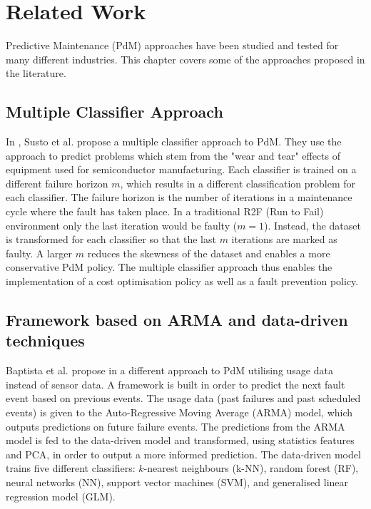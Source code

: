 \chapter{Related Work}
\label{cha:related-work}

Predictive Maintenance (PdM) approaches have been studied and tested for many different industries.
This chapter covers some of the approaches proposed in the literature.

\section{Multiple Classifier Approach} \label{sec:multiple-classifier-approach}


In \cite{Susto2015}, Susto et al. propose a multiple classifier approach to PdM.
They use the approach to predict problems which stem from the "wear and tear" effects of equipment used for semiconductor manufacturing.
Each classifier is trained on a different failure horizon $m$, which results in a different classification problem for each classifier.
The failure horizon is the number of iterations in a maintenance cycle where the fault has taken place.
In a traditional R2F (Run to Fail) environment only the last iteration would be faulty ($m=1$).
Instead, the dataset is transformed for each classifier so that the last $m$ iterations are marked as faulty.
A larger $m$ reduces the skewness of the dataset and enables a more conservative PdM policy.
The multiple classifier approach thus enables the implementation of a cost optimisation policy as well as a fault prevention policy.

\section{Framework based on ARMA and data-driven techniques} \label{sec:arma-framework}

Baptista et al. propose in \cite{Baptista2018} a different approach to PdM utilising usage data instead of sensor data.
A framework is built in order to predict the next fault event based on previous events.
The usage data (past failures and past scheduled events) is given to the Auto-Regressive Moving Average (ARMA) model, which outputs predictions on future failure events.
The predictions from the ARMA model is fed to the data-driven model and transformed, using statistics features and PCA, in order to output a more informed prediction.
The data-driven model trains five different classifiers: $k$-nearest neighbours (k-NN), random forest (RF), neural networks (NN), support vector machines (SVM), and generalised linear regression model (GLM).

